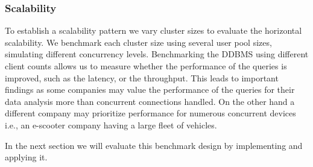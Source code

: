 \subsubsection{Scalability}
To establish a scalability pattern we vary cluster sizes to evaluate the horizontal scalability.
We benchmark each cluster size using several user pool sizes, simulating different concurrency levels.
Benchmarking the DDBMS using different client counts allows us to measure whether the performance of the queries is improved, such as the latency, or the throughput.
This leads to important findings as some companies may value the performance of the queries for their data analysis more than concurrent connections handled.
On the other hand a different company may prioritize performance for numerous concurrent devices i.e., an e-scooter company having a large fleet of vehicles.

In the next section we will evaluate this benchmark design by implementing and applying it.
